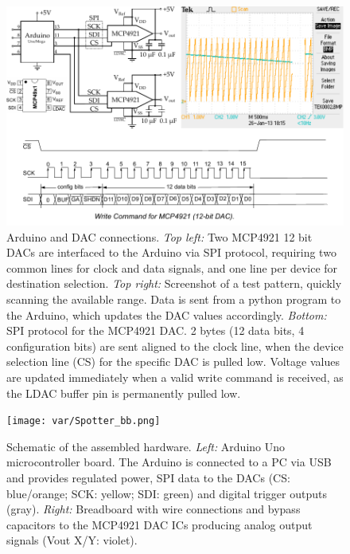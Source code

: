 \begin{figure}%
	\centering
		\includegraphics [width=\linewidth]{gfx/circuit.pdf} %
	\caption[Test]{Arduino and DAC connections. \emph{Top left:} Two MCP4921 12 bit DACs are interfaced to the Arduino via SPI protocol, requiring two common lines for clock and data signals, and one line per device for destination selection. \emph{Top right:} Screenshot of a test pattern, quickly scanning the available range. Data is sent from a python program to the Arduino, which updates the DAC values accordingly. \emph{Bottom:} SPI protocol for the MCP4921 DAC. 2 bytes (12 data bits, 4 configuration bits) are sent aligned to the clock line, when the device selection line (CS) for the specific DAC is pulled low. Voltage values are updated immediately when a valid write command is received, as the LDAC buffer pin is permanently pulled low.}
	\label{fig:circuit}
\end{figure}

\begin{figure}%
	\centering
		\texttt{[image: var/Spotter\_bb.png]} %
	\caption[Test]{Schematic of the assembled hardware. \emph{Left:} Arduino Uno microcontroller board. The Arduino is connected to a PC via USB and provides regulated power, SPI data to the DACs (CS: blue/orange; SCK: yellow; SDI: green) and digital trigger outputs (gray). \emph{Right:} Breadboard with wire connections and bypass capacitors to the MCP4921 DAC ICs producing analog output signals (Vout X/Y: violet).}
	\label{fig:hardware}
\end{figure}

